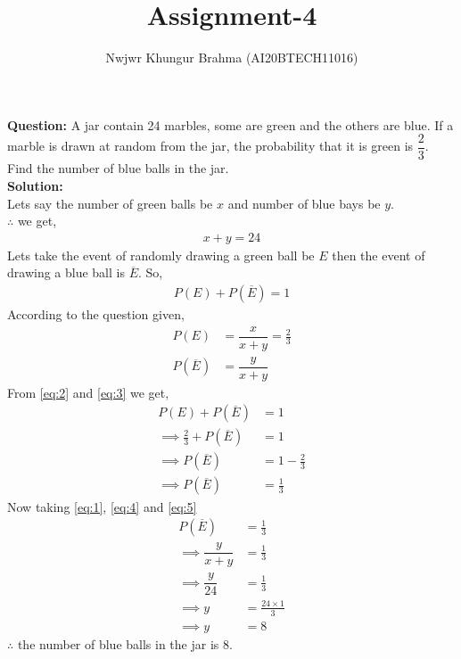 \documentclass[journal,12pt,twocolumn]{IEEEtran}
\title{Assignment-4}
\author{Nwjwr Khungur Brahma (AI20BTECH11016)}
\begin{document}
\maketitle
\textbf{Question:}
A jar contain 24 marbles, some are green and the others are blue. If a marble is drawn at random from the jar, the probability that it is green is $\dfrac{2}{3}$. Find the number of blue balls in the jar.\\
\textbf{Solution:}\\
Lets say the number of green balls be $x$ and number of blue bays be $y$.\\
$\therefore$ we get,
\begin{align}
x + y = 24\label{eq:1}
\end{align}
Lets take the event of randomly drawing a green ball be $E$ then the event of drawing a blue ball is $\overline{E}$. So,
\begin{align}
P(E)+P(\overline{E})=1\label{eq:2}
\end{align}
According to the question given,
\begin{align}
P(E)&=\dfrac{x}{x+y}=\frac{2}{3}\label{eq:3}\\
P(\overline{E})&=\dfrac{y}{x+y}\label{eq:4}
\end{align}
From \eqref{eq:2} and \eqref{eq:3} we get,
\begin{align}
P(E)+P(\overline{E})&=1\\
\implies \frac{2}{3}+P(\overline{E})&=1\\
\implies P(\overline{E})&=1-\frac{2}{3}\\
\implies P(\overline{E})&=\frac{1}{3}\label{eq:5}
\end{align}
Now taking \eqref{eq:1}, \eqref{eq:4} and \eqref{eq:5}
\begin{align}
P(\overline{E})&=\frac{1}{3}\\
\implies \dfrac{y}{x+y} &=\frac{1}{3}\\
\implies \dfrac{y}{24}&=\frac{1}{3}\\
\implies y&=\frac{24\times1}{3}\\
\implies y&=8
\end{align}
$\therefore$ the number of blue balls in the jar is 8.
\end{document}
